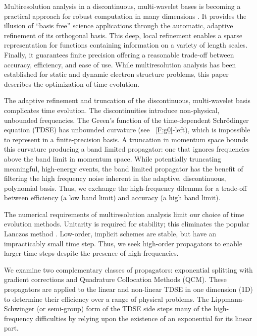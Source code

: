 \documentclass[review,letterpaper]{elsarticle}
\begin{document}
Multiresolution analysis in a discontinuous, multi-wavelet bases is becoming a practical
approach for robust computation in many dimensions \cite{Alpert:1990,A-B-G-V:2002,ibmpaper,mrqc1}.
It provides the illusion of ``basis free'' science applications through the automatic,
adaptive refinement of its orthogonal basis.
This deep, local refinement enables a sparse representation
for functions containing information on a variety of length scales.
Finally, it guarantees finite precision offering a reasonable trade-off between
accuracy, efficiency, and ease of use.
While multiresolution analysis has been established for static \cite{mrqc1}
and dynamic \cite{Vence:2012iy} electron structure problems,
this paper describes the optimization of time evolution.

The adaptive refinement and truncation of the discontinuous, multi-wavelet basis complicates time evolution.
The discontinuities introduce non-physical, unbounded frequencies.
The Green's function of the time-dependent
Schr\"odinger equation (TDSE) has unbounded curvature (see \figurename~\ref{F:g0}-left),
which is impossible to represent in a finite-precision basis. A truncation in momentum space
bounds this curvature producing a band limited propagator: one that ignores frequencies above
the band limit in momentum space. While potentially truncating meaningful, high-energy events, the band limited
propagator has the benefit of filtering the high frequency noise inherent in the adaptive,
discontinuous, polynomial basis. Thus, we exchange the high-frequency dilemma for a trade-off
between efficiency (a low band limit) and accuracy (a high band limit).

The numerical requirements of multiresolution analysis limit our choice of time evolution methods.
Unitarity is required for stability; this eliminates the popular Lanczos method \cite{Leforestier:1991co}.
Low-order, implicit schemes are stable, but have an impracticably small time step.
Thus, we seek high-order propagators to enable larger time steps despite
the presence of high-frequencies.

We examine two complementary classes of propagators:
exponential splitting with gradient corrections and Quadrature Collocation Methods (QCM).
These propagators are applied to the linear and non-linear TDSE in one dimension (1D)
to determine their efficiency over a range of physical problems.
The Lippmann-Schwinger (or semi-group) form of the TDSE side steps many of the
high-frequency difficulties by relying upon the existence of an exponential for its linear part.
\end{document}
